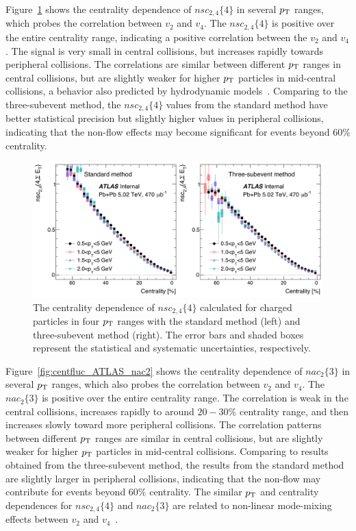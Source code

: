 Figure~\ref{fig:centfluc_ATLAS_nsc24} shows the centrality dependence of $nsc_{2,4}\{4\}$ in several $p_\text{T}$ ranges, which probes the correlation between $v_2$ and $v_4$. The $nsc_{2,4}\{4\}$ is positive over the entire centrality range, indicating a positive correlation between the $v_2$ and $v_4$. The signal is very small in central collisions, but increases rapidly towards peripheral collisions. The correlations are similar between different $p_\text{T}$ ranges in central collisions, but are slightly weaker for higher $p_\text{T}$ particles in mid-central collisions, a behavior also predicted by hydrodynamic models~\cite{Niemi:2012aj, Zhu:2016puf}. Comparing to the three-subevent method, the $nsc_{2,4}\{4\}$ values from the standard method have better statistical precision but slightly higher values in peripheral collisions, indicating that the non-flow effects may become significant for events beyond $60\%$ centrality.

\begin{figure}[H]
\centering
\includegraphics[width=.95\linewidth]{figs/chapter_centfluc/ATLAS_nsc24.png}
\caption{The centrality dependence of $nsc_{2,4}\{4\}$ calculated for charged particles in four $p_\text{T}$ ranges with the standard method (left) and three-subevent method (right). The error bars and shaded boxes represent the statistical and systematic uncertainties, respectively.}
\label{fig:centfluc_ATLAS_nsc24}
\end{figure}

Figure~\ref{fig:centfluc_ATLAS_nac2} shows the centrality dependence of $nac_2\{3\}$ in several $p_\text{T}$ ranges, which also probes the correlation between $v_2$ and $v_4$. The $nac_2\{3\}$ is positive over the entire centrality range. The correlation is weak in the central collisions, increases rapidly to around $20-30\%$ centrality range, and then increases slowly toward more peripheral collisions. The correlation patterns between different $p_\text{T}$ ranges are similar in central collisions, but are slightly weaker for higher $p_\text{T}$ particles in mid-central collisions. Comparing to results obtained from the three-subevent method, the results from the standard method are slightly larger in peripheral collisions, indicating that the non-flow may contribute for events beyond $60\%$ centrality. The similar $p_\text{T}$ and centrality dependences for $nsc_{2,4}\{4\}$ and $nac_2\{3\}$ are related to non-linear mode-mixing effects between $v_2$ and $v_4$~\cite{Giacalone:2016afq}.

